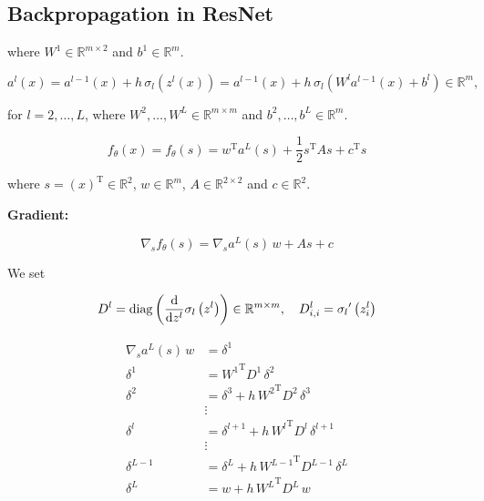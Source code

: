 \subsection{Backpropagation in ResNet}



where $W^{1} \in \mathbb{R}^{m \times 2}$ and $b^{1} \in \mathbb{R}^{m}$.

\begin{equation*}
    a^{l}\left(x\right) = a^{l-1}\left(x\right) + h \, \sigma_{l} \left(z^{l}\left(x\right)\right) = a^{l-1}\left(x\right) + h \, \sigma_{l} \left(W^{l} a^{l-1}\left(x\right) + b^{l}\right) \in \mathbb{R}^{m}, 
\end{equation*}

for $l = 2, \ldots, L$, where $W^{2}, \ldots, W^{L} \in \mathbb{R}^{m \times m}$ and $b^{2}, \ldots, b^{L} \in \mathbb{R}^{m}$.

\begin{equation*}
    f_{\theta}\left(x\right) = f_{\theta}\left(s\right) = w^{\mathrm{T}} a^{L}\left(s\right) + \frac{1}{2} s^{\mathrm{T}} A s + c^{\mathrm{T}} s 
\end{equation*}

where $s = \left(x\right)^{\mathrm{T}} \in \mathbb{R}^{2}$, $w \in \mathbb{R}^{m}$, $A \in \mathbb{R}^{2 \times 2}$ and $c \in \mathbb{R}^2$.

\textbf{Gradient:}

\begin{equation*}
    \nabla_s f_{\theta}\left(s\right) = \nabla_s a^{L}\left(s\right) \, w + A s + c
\end{equation*}

We set

\begin{equation*}
    D^{l} = \mathrm{diag} \left( \frac{\textup{d}}{\textup{d}z^{l}} \sigma_{l} \left(z^{l}\right) \right) \in \mathbb{R}^{m \times m}, \quad D_{i, i}^{l} = {\sigma_{l}}^{\prime} \left(z_{i}^{l}\right)
\end{equation*}

\begin{align*}
    \nabla_s a^{L}\left(s\right) \, w & = \delta^{1}  \\
    \delta^{1} & = {W^{1}}^{\mathrm{T}} D^{1} \, \delta^{2} \\
    \delta^{2} & = \delta^{3} + h \, {W^{2}}^{\mathrm{T}} D^{2} \, \delta^{3} \\
    &\vdots\\
    \delta^{l} & = \delta^{l+1} + h \, {W^{l}}^{\mathrm{T}} D^{l} \, \delta^{l+1} \\
    &\vdots\\
    \delta^{L-1} & = \delta^{L} + h \, {W^{L-1}}^{\mathrm{T}} D^{L-1} \, \delta^{L} \\
    \delta^{L} & = w + h \, {W^{L}}^{\mathrm{T}} D^{L} \, w
\end{align*}


